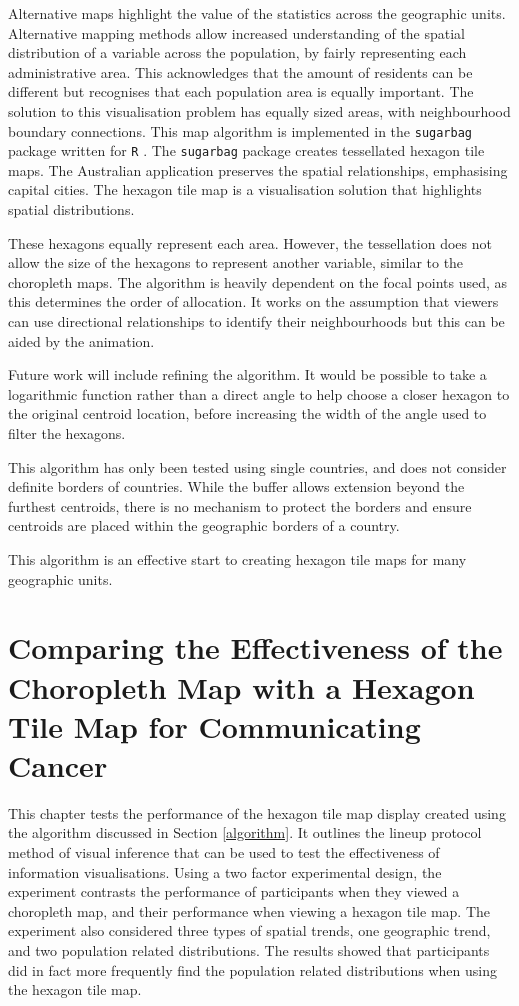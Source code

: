 \documentclass{monashthesis}
\begin{document}
Alternative maps highlight the value of the statistics across the geographic units. Alternative mapping methods allow increased understanding of the spatial distribution of a variable across the population, by fairly representing each administrative area. This acknowledges that the amount of residents can be different but recognises that each population area is equally important. The solution to this visualisation problem has equally sized areas, with neighbourhood boundary connections. This map algorithm is implemented in the \texttt{sugarbag} \autocite{sugarbag} package written for \texttt{R} \autocite{R}.
The \texttt{sugarbag} package creates tessellated hexagon tile maps. The Australian application preserves the spatial relationships, emphasising capital cities. The hexagon tile map is a visualisation solution that highlights spatial distributions.

These hexagons equally represent each area. However, the tessellation does not allow the size of the hexagons to represent another variable, similar to the choropleth maps.
The algorithm is heavily dependent on the focal points used, as this determines the order of allocation. It works on the assumption that viewers can use directional relationships to identify their neighbourhoods but this can be aided by the animation.

Future work will include refining the algorithm. It would be possible to take a logarithmic function rather than a direct angle to help choose a closer hexagon to the original centroid location, before increasing the width of the angle used to filter the hexagons.

This algorithm has only been tested using single countries, and does not consider definite borders of countries. While the buffer allows extension beyond the furthest centroids, there is no mechanism to protect the borders and ensure centroids are placed within the geographic borders of a country.

This algorithm is an effective start to creating hexagon tile maps for many geographic units.

\hypertarget{experiment}{%
\chapter{Comparing the Effectiveness of the Choropleth Map with a Hexagon Tile Map for Communicating Cancer}\label{experiment}}

This chapter tests the performance of the hexagon tile map display created using the algorithm discussed in Section \ref{algorithm}.
It outlines the lineup protocol method of visual inference that can be used to test the effectiveness of information visualisations.
Using a two factor experimental design, the experiment contrasts the performance of participants when they viewed a choropleth map, and their performance when viewing a hexagon tile map.
The experiment also considered three types of spatial trends, one geographic trend, and two population related distributions.
The results showed that participants did in fact more frequently find the population related distributions when using the hexagon tile map.
\end{document}
